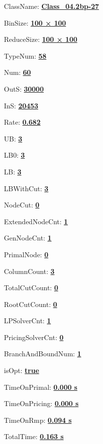 \documentclass[11pt]{article}
\begin{document}
\pagestyle{empty}


ClassName: \underline{\textbf{Class_04.2bp-27}}
\par
BinSize: \underline{\textbf{100 × 100}}
\par
ReduceSize: \underline{\textbf{100 × 100}}
\par
TypeNum: \underline{\textbf{58}}
\par
Num: \underline{\textbf{60}}
\par
OutS: \underline{\textbf{30000}}
\par
InS: \underline{\textbf{20453}}
\par
Rate: \underline{\textbf{0.682}}
\par
UB: \underline{\textbf{3}}
\par
LB0: \underline{\textbf{3}}
\par
LB: \underline{\textbf{3}}
\par
LBWithCut: \underline{\textbf{3}}
\par
NodeCut: \underline{\textbf{0}}
\par
ExtendedNodeCnt: \underline{\textbf{1}}
\par
GenNodeCnt: \underline{\textbf{1}}
\par
PrimalNode: \underline{\textbf{0}}
\par
ColumnCount: \underline{\textbf{3}}
\par
TotalCutCount: \underline{\textbf{0}}
\par
RootCutCount: \underline{\textbf{0}}
\par
LPSolverCnt: \underline{\textbf{1}}
\par
PricingSolverCnt: \underline{\textbf{0}}
\par
BranchAndBoundNum: \underline{\textbf{1}}
\par
isOpt: \underline{\textbf{true}}
\par
TimeOnPrimal: \underline{\textbf{0.000 s}}
\par
TimeOnPricing: \underline{\textbf{0.000 s}}
\par
TimeOnRmp: \underline{\textbf{0.094 s}}
\par
TotalTime: \underline{\textbf{0.163 s}}
\par
\newpage
\end{document}
